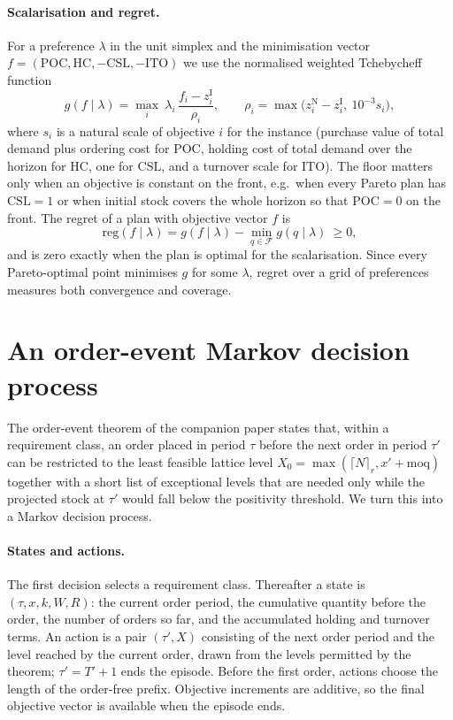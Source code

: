 \documentclass[preprint,12pt,authoryear]{elsarticle}
\newcommand{\POC}{\mathrm{POC}}\newcommand{\HC}{\mathrm{HC}}\newcommand{\CSL}{\mathrm{CSL}}\newcommand{\ITO}{\mathrm{ITO}}
\begin{document}
\paragraph{Scalarisation and regret.}
For a preference $\lambda$ in the unit simplex and the minimisation vector
$f=(\POC,\HC,-\CSL,-\ITO)$ we use the normalised weighted Tchebycheff function
\begin{equation}
g(f\mid\lambda)=\max_{i}\ \lambda_i\,\frac{f_i-z^{\mathrm{I}}_i}{\rho_i},\qquad
\rho_i=\max\bigl(z^{\mathrm{N}}_i-z^{\mathrm{I}}_i,\ 10^{-3}s_i\bigr),
\end{equation}
where $s_i$ is a natural scale of objective $i$ for the instance (purchase value of total demand
plus ordering cost for $\POC$, holding cost of total demand over the horizon for $\HC$, one for
$\CSL$, and a turnover scale for $\ITO$). The floor matters only when an objective is constant on
the front, e.g.\ when every Pareto plan has $\CSL=1$ or when initial stock covers the whole
horizon so that $\POC=0$ on the front. The regret of a plan with objective vector $f$ is
\begin{equation}
\mathrm{reg}(f\mid\lambda)=g(f\mid\lambda)-\min_{q\in\mathcal{F}}g(q\mid\lambda)\ \ge 0,
\end{equation}
and is zero exactly when the plan is optimal for the scalarisation. Since every
Pareto-optimal point minimises $g$ for some $\lambda$, regret over a grid of preferences measures
both convergence and coverage.

\section{An order-event Markov decision process}\label{sec:mdp}

The order-event theorem of the companion paper states that, within a requirement class, an order
placed in period $\tau$ before the next order in period $\tau'$ can be restricted to the least
feasible lattice level $X_0=\max(\lceil N\rceil_r, x'+\mathrm{moq})$ together with a short list of
exceptional levels that are needed only while the projected stock at $\tau'$ would fall below the
positivity threshold. We turn this into a Markov decision process.

\paragraph{States and actions.}
The first decision selects a requirement class. Thereafter a state is
$(\tau,x,k,W,R)$: the current order period, the cumulative quantity before the order, the number
of orders so far, and the accumulated holding and turnover terms. An action is a pair
$(\tau',X)$ consisting of the next order period and the level reached by the current order, drawn
from the levels permitted by the theorem; $\tau'=T'+1$ ends the episode. Before the first order,
actions choose the length of the order-free prefix. Objective increments are additive, so the
final objective vector is available when the episode ends.
\end{document}
